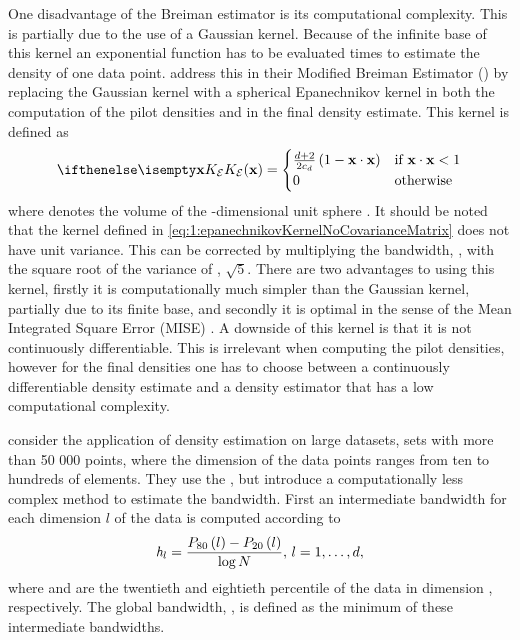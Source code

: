 	One disadvantage of the Breiman estimator is its computational complexity. This is partially due to the use of a Gaussian kernel. Because of the infinite base of this kernel an exponential function has to be evaluated \varNumPatterns times to estimate the density of one data point. 
	\textcite{wilkinson1995dataplot} address this in their Modified Breiman Estimator (\mbe) by replacing the Gaussian kernel with a spherical Epanechnikov kernel in both the computation of the pilot densities and in the final density estimate. This kernel is defined as
	\begin{equation}\label{eq:1:epanechnikovKernelNoCovarianceMatrix}
		\varKernel[\varEpan]{\varPattern} = 
		\begin{cases}
			\frac{\varDim + 2}{2\varUnitSphere{\varDim}} \left( 1 - \varPattern \cdot \varPattern \right) & \text{if } \varPattern \cdot \varPattern < 1\\
			0 & \text{otherwise}
		\end{cases}
	\end{equation}
	 where \varUnitSphere{\varDim} denotes the volume of the \varDim-dimensional unit sphere \cite{epanechnikov1969non}. It should be noted that the kernel defined in \cref{eq:1:epanechnikovKernelNoCovarianceMatrix} does not have unit variance. This can be corrected by multiplying the bandwidth, \varBandwidth,  with the square root of the variance of \varKernel[\varEpan]{}, \ie $\sqrt{5}$. There are two advantages to using this kernel, firstly it is computationally much simpler than the Gaussian kernel, partially due to its finite base, and secondly it is optimal in the sense of the Mean Integrated Square Error (MISE) \cite{epanechnikov1969non}. A downside of this kernel is that it is not continuously differentiable. This is irrelevant when computing the pilot densities, however for the final densities one has to choose between a continuously differentiable density estimate and a density estimator that has a low computational complexity.

	\textcite{ferdosi2011comparison} consider the application of density estimation on large datasets, \ie sets with more than 50 000 points, where the dimension of the data points ranges from ten to hundreds of elements. They use the \mbe, but introduce a computationally less complex method to estimate the bandwidth. First an intermediate bandwidth for each dimension $l$ of the data is computed according to		
	\begin{equation}\label{eq:1:ferdosiGeneralBandwidth}
			\mathit{h}_{l} = \frac{P_{80}\left( l \right) - P_{20}\left( l \right)}{\log N}, \, l = 1, \dotsc, d,
		\end{equation}
	where  and  are the twentieth and eightieth percentile of the data in dimension \itDim, respectively. The global bandwidth, \varBandwidth, is defined as the minimum of these intermediate bandwidths.

